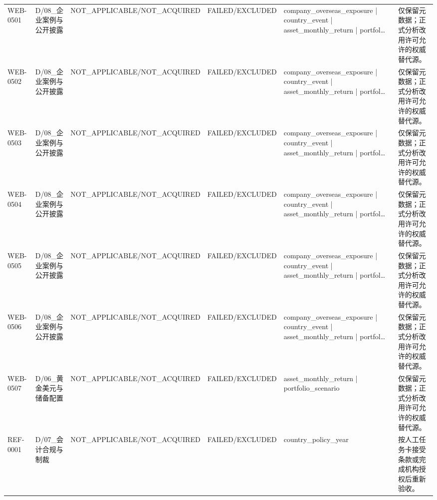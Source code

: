 \begin{landscape}
\begin{longtable}{p{1.8cm}p{2.6cm}p{2.6cm}p{2.6cm}p{4.8cm}p{7.2cm}}
WEB-0501 & D/\allowbreak{}08\_\allowbreak{}企业案例与公开披露 & NOT\_\allowbreak{}APPLICABLE/\allowbreak{}NOT\_\allowbreak{}ACQUIRED & FAILED/\allowbreak{}EXCLUDED & company\_\allowbreak{}overseas\_\allowbreak{}exposure | country\_\allowbreak{}event | asset\_\allowbreak{}monthly\_\allowbreak{}return | portfol… & 仅保留元数据；正式分析改用许可允许的权威替代源。\\
WEB-0502 & D/\allowbreak{}08\_\allowbreak{}企业案例与公开披露 & NOT\_\allowbreak{}APPLICABLE/\allowbreak{}NOT\_\allowbreak{}ACQUIRED & FAILED/\allowbreak{}EXCLUDED & company\_\allowbreak{}overseas\_\allowbreak{}exposure | country\_\allowbreak{}event | asset\_\allowbreak{}monthly\_\allowbreak{}return | portfol… & 仅保留元数据；正式分析改用许可允许的权威替代源。\\
WEB-0503 & D/\allowbreak{}08\_\allowbreak{}企业案例与公开披露 & NOT\_\allowbreak{}APPLICABLE/\allowbreak{}NOT\_\allowbreak{}ACQUIRED & FAILED/\allowbreak{}EXCLUDED & company\_\allowbreak{}overseas\_\allowbreak{}exposure | country\_\allowbreak{}event | asset\_\allowbreak{}monthly\_\allowbreak{}return | portfol… & 仅保留元数据；正式分析改用许可允许的权威替代源。\\
WEB-0504 & D/\allowbreak{}08\_\allowbreak{}企业案例与公开披露 & NOT\_\allowbreak{}APPLICABLE/\allowbreak{}NOT\_\allowbreak{}ACQUIRED & FAILED/\allowbreak{}EXCLUDED & company\_\allowbreak{}overseas\_\allowbreak{}exposure | country\_\allowbreak{}event | asset\_\allowbreak{}monthly\_\allowbreak{}return | portfol… & 仅保留元数据；正式分析改用许可允许的权威替代源。\\
WEB-0505 & D/\allowbreak{}08\_\allowbreak{}企业案例与公开披露 & NOT\_\allowbreak{}APPLICABLE/\allowbreak{}NOT\_\allowbreak{}ACQUIRED & FAILED/\allowbreak{}EXCLUDED & company\_\allowbreak{}overseas\_\allowbreak{}exposure | country\_\allowbreak{}event | asset\_\allowbreak{}monthly\_\allowbreak{}return | portfol… & 仅保留元数据；正式分析改用许可允许的权威替代源。\\
WEB-0506 & D/\allowbreak{}08\_\allowbreak{}企业案例与公开披露 & NOT\_\allowbreak{}APPLICABLE/\allowbreak{}NOT\_\allowbreak{}ACQUIRED & FAILED/\allowbreak{}EXCLUDED & company\_\allowbreak{}overseas\_\allowbreak{}exposure | country\_\allowbreak{}event | asset\_\allowbreak{}monthly\_\allowbreak{}return | portfol… & 仅保留元数据；正式分析改用许可允许的权威替代源。\\
WEB-0507 & D/\allowbreak{}06\_\allowbreak{}黄金美元与储备配置 & NOT\_\allowbreak{}APPLICABLE/\allowbreak{}NOT\_\allowbreak{}ACQUIRED & FAILED/\allowbreak{}EXCLUDED & asset\_\allowbreak{}monthly\_\allowbreak{}return | portfolio\_\allowbreak{}scenario & 仅保留元数据；正式分析改用许可允许的权威替代源。\\
REF-0001 & D/\allowbreak{}07\_\allowbreak{}会计合规与制裁 & NOT\_\allowbreak{}APPLICABLE/\allowbreak{}NOT\_\allowbreak{}ACQUIRED & FAILED/\allowbreak{}EXCLUDED & country\_\allowbreak{}policy\_\allowbreak{}year & 按人工任务卡接受条款或完成机构授权后重新验收。\\
\bottomrule\end{longtable}\endgroup\end{landscape}
